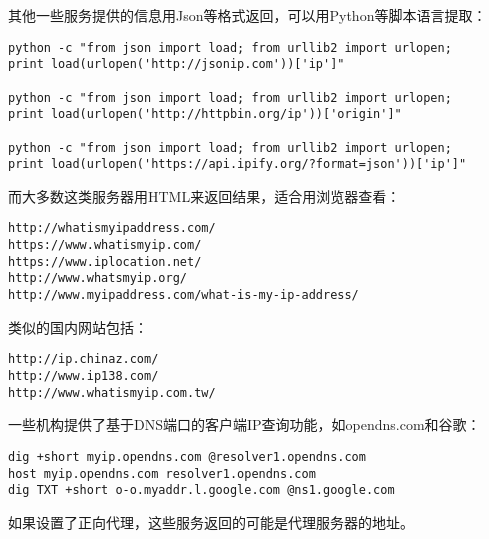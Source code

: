 其他一些服务提供的信息用Json等格式返回，可以用Python等脚本语言提取：
\begin{verbatim}
python -c "from json import load; from urllib2 import urlopen; 
print load(urlopen('http://jsonip.com'))['ip']"

python -c "from json import load; from urllib2 import urlopen; 
print load(urlopen('http://httpbin.org/ip'))['origin']" 

python -c "from json import load; from urllib2 import urlopen; 
print load(urlopen('https://api.ipify.org/?format=json'))['ip']"
\end{verbatim}


而大多数这类服务器用HTML来返回结果，适合用浏览器查看：
\begin{verbatim}
http://whatismyipaddress.com/
https://www.whatismyip.com/
https://www.iplocation.net/
http://www.whatsmyip.org/
http://www.myipaddress.com/what-is-my-ip-address/
\end{verbatim}

类似的国内网站包括：
\begin{verbatim}
http://ip.chinaz.com/
http://www.ip138.com/
http://www.whatismyip.com.tw/
\end{verbatim}


一些机构提供了基于DNS端口的客户端IP查询功能，如opendns.com和谷歌：
\begin{verbatim}
dig +short myip.opendns.com @resolver1.opendns.com
host myip.opendns.com resolver1.opendns.com
dig TXT +short o-o.myaddr.l.google.com @ns1.google.com
\end{verbatim}



如果设置了正向代理，这些服务返回的可能是代理服务器的地址。


